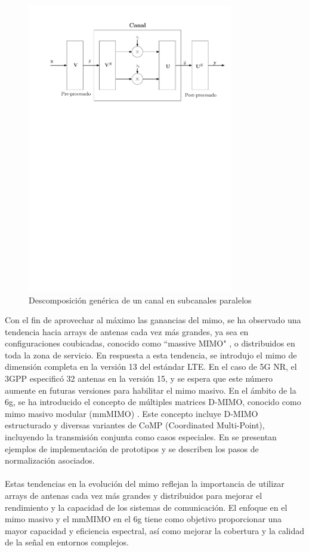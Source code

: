 \begin{figure}[h!]
    \centering
    \includegraphics[width=0.8\textwidth]{archivos/img/teoria/fig_3.pdf}
    \caption{Descomposición genérica de un canal  en subcanales paralelos}
    \label{fig:fig_3}
\end{figure}

Con el fin de aprovechar al máximo las ganancias del \gls{mimo}, se ha observado una tendencia hacia arrays de antenas cada vez más grandes, ya sea en configuraciones coubicadas, conocido como ``massive MIMO" \cite{bjornson2016massive}, o distribuidos en toda la zona de servicio. En respuesta a esta tendencia, se introdujo el \gls{mimo} de dimensión completa en la versión 13 del estándar LTE. En el caso de 5G NR, el 3GPP especificó 32 antenas en la versión 15, y se espera que este número aumente en futuras versiones para habilitar el \gls{mimo} masivo. En el ámbito de la \gls{6g}, se ha introducido el concepto de múltiples matrices D-MIMO, conocido como \gls{mimo} masivo modular (mmMIMO) \cite{jeon2021mimo}. Este concepto incluye D-MIMO estructurado y diversas variantes de CoMP (Coordinated Multi-Point), incluyendo la transmisión conjunta como casos especiales. En \cite{jeon2021mimo} se presentan ejemplos de implementación de prototipos y se describen los pasos de normalización asociados.\\
\\
Estas tendencias en la evolución del \gls{mimo} reflejan la importancia de utilizar arrays de antenas cada vez más grandes y distribuidos para mejorar el rendimiento y la capacidad de los sistemas de comunicación. El enfoque en el \gls{mimo} masivo y el mmMIMO en el \gls{6g} tiene como objetivo proporcionar una mayor capacidad y eficiencia espectral, así como mejorar la cobertura y la calidad de la señal en entornos complejos.

